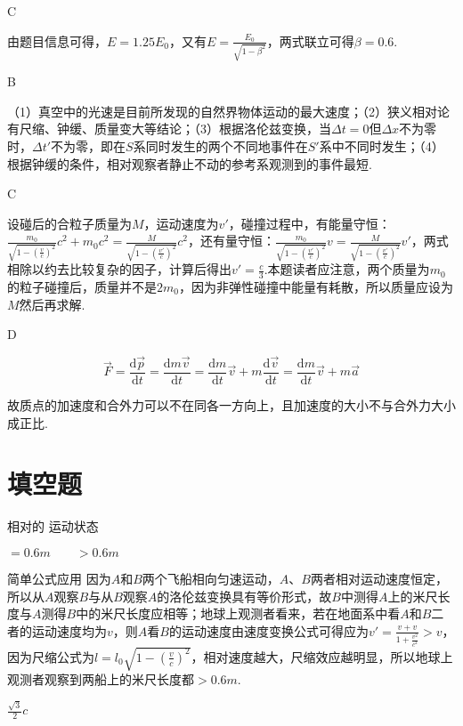 \documentclass[b5paper,opensource]{./template/qyxf-book}
\newcommand{\di}[1]{\mathrm{d}#1}
\begin{document}
C

\solve
由题目信息可得，$E=1.25E_0$，又有$E=\frac{E_0}{\sqrt{1-\beta^2}}$，两式联立可得$\beta=0.6$.

B

\solve
（1）真空中的光速是目前所发现的自然界物体运动的最大速度；（2）狭义相对论有尺缩、钟缓、质量变大等结论；（3）根据洛伦兹变换，当$\Delta t=0$但$\Delta x$不为零时，$\Delta t'$不为零，即在$S$系同时发生的两个不同地事件在$S'$系中不同时发生；（4）根据钟缓的条件，相对观察者静止不动的参考系观测到的事件最短.

C

\solve
设碰后的合粒子质量为$M$，运动速度为$v'$，碰撞过程中，有能量守恒：$\frac{m_0}{\sqrt{1-(\frac{v}{c})^2}}c^2+m_0c^2=\frac{M}{\sqrt{1-(\frac{v'}{c})^2}}c^2$，还有量守恒：$\frac{m_0}{\sqrt{1-(\frac{v'}{c})^2}}v=\frac{M}{\sqrt{1-(\frac{v'}{c})^2}}v'$，两式相除以约去比较复杂的因子，计算后得出$v'=\frac{c}{3}$.本题读者应注意，两个质量为$m_0$的粒子碰撞后，质量并不是$2m_0$，因为非弹性碰撞中能量有耗散，所以质量应设为$M$然后再求解.

D

\solve
\begin{equation*}
\overrightarrow{F}=\frac{\di \overrightarrow{p}}{\di t}=\frac{\di m\overrightarrow{v}}{\di t}=\frac{\di m}{\di t}\overrightarrow{v}+m\frac{\di\overrightarrow{v}}{\di t}=\frac{\di m}{\di t}\overrightarrow{v}+m\overrightarrow{a}
\end{equation*}

故质点的加速度和合外力可以不在同各一方向上，且加速度的大小不与合外力大小成正比.

\section{填空题}
 相对的 \qquad 运动状态

 $=0.6m\qquad >0.6m$

\solve 简单公式应用
因为$A$和$B$两个飞船相向匀速运动，$A$、$B$两者相对运动速度恒定，所以从$A$观察$B$与从$B$观察$A$的洛伦兹变换具有等价形式，故$B$中测得$A$上的米尺长度与$A$测得$B$中的米尺长度应相等；地球上观测者看来，若在地面系中看$A$和$B$二者的运动速度均为$v$，则$A$看$B$的运动速度由速度变换公式可得应为$v'=\frac{v+v}{1+\frac{v^2}{c^2}}>v$，因为尺缩公式为$l=l_0\sqrt{1-(\frac{v}{c})^2}$，相对速度越大，尺缩效应越明显，所以地球上观测者观察到两船上的米尺长度都$>0.6m$.

 $\frac{\sqrt{3}}{2}c$
\end{document}
